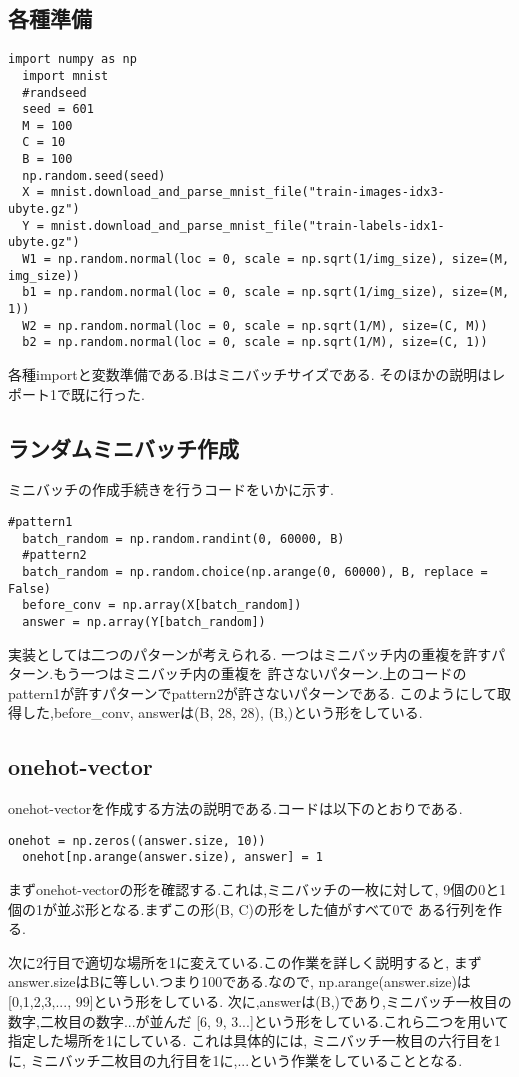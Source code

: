 \documentclass[a4paper,11pt]{jsarticle}
\begin{document}
\subsection*{各種準備}
\begin{lstlisting}[caption=準備]
  import numpy as np
  import mnist
  #randseed
  seed = 601
  M = 100
  C = 10
  B = 100
  np.random.seed(seed)
  X = mnist.download_and_parse_mnist_file("train-images-idx3-ubyte.gz")
  Y = mnist.download_and_parse_mnist_file("train-labels-idx1-ubyte.gz")
  W1 = np.random.normal(loc = 0, scale = np.sqrt(1/img_size), size=(M, img_size))
  b1 = np.random.normal(loc = 0, scale = np.sqrt(1/img_size), size=(M, 1))
  W2 = np.random.normal(loc = 0, scale = np.sqrt(1/M), size=(C, M))
  b2 = np.random.normal(loc = 0, scale = np.sqrt(1/M), size=(C, 1))
\end{lstlisting}
\par
各種importと変数準備である.Bはミニバッチサイズである.
そのほかの説明はレポート1で既に行った.

\subsection*{ランダムミニバッチ作成}
ミニバッチの作成手続きを行うコードをいかに示す.
\begin{lstlisting}[caption=ミニバッチ]
  #pattern1
  batch_random = np.random.randint(0, 60000, B)
  #pattern2
  batch_random = np.random.choice(np.arange(0, 60000), B, replace = False)
  before_conv = np.array(X[batch_random])
  answer = np.array(Y[batch_random])
\end{lstlisting}
実装としては二つのパターンが考えられる.
一つはミニバッチ内の重複を許すパターン.もう一つはミニバッチ内の重複を
許さないパターン.上のコードのpattern1が許すパターンでpattern2が許さないパターンである.
このようにして取得した,before\_conv, answerは(B, 28, 28), (B,)という形をしている.

\subsection*{onehot-vector}
onehot-vectorを作成する方法の説明である.コードは以下のとおりである.
\begin{lstlisting}[caption=onehot-vector]
  onehot = np.zeros((answer.size, 10))
  onehot[np.arange(answer.size), answer] = 1
\end{lstlisting}
まずonehot-vectorの形を確認する.これは,ミニバッチの一枚に対して,
9個の0と1個の1が並ぶ形となる.まずこの形(B, C)の形をした値がすべて0で
ある行列を作る.
\par 
次に2行目で適切な場所を1に変えている.この作業を詳しく説明すると,
まずanswer.sizeはBに等しい.つまり100である.なので,
np.arange(answer.size)は[0,1,2,3,..., 99]という形をしている.
次に,answerは(B,)であり,ミニバッチ一枚目の数字,二枚目の数字...が並んだ
[6, 9, 3...]という形をしている.これら二つを用いて指定した場所を1にしている. これは具体的には,
ミニバッチ一枚目の六行目を1に, ミニバッチ二枚目の九行目を1に,...という作業をしていることとなる.
\end{document}
